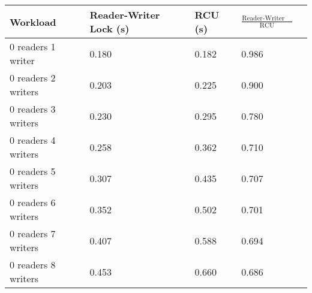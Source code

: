 \begin{tabular}{|l|l|l|l|l|}
\hline Workload &Reader-Writer Lock (s) & RCU (s) & $\frac{\mbox{Reader-Writer Lock}}{\mbox{RCU}} $ \\
\hline 0 readers 1 writer & 0.180 & 0.182&0.986\\
\hline 0 readers 2 writers & 0.203 & 0.225&0.900\\
\hline 0 readers 3 writers & 0.230 & 0.295&0.780\\
\hline 0 readers 4 writers & 0.258 & 0.362&0.710\\
\hline 0 readers 5 writers & 0.307 & 0.435&0.707\\
\hline 0 readers 6 writers & 0.352 & 0.502&0.701\\
\hline 0 readers 7 writers & 0.407 & 0.588&0.694\\
\hline 0 readers 8 writers & 0.453 & 0.660&0.686\\
\hline
\end{tabular}
